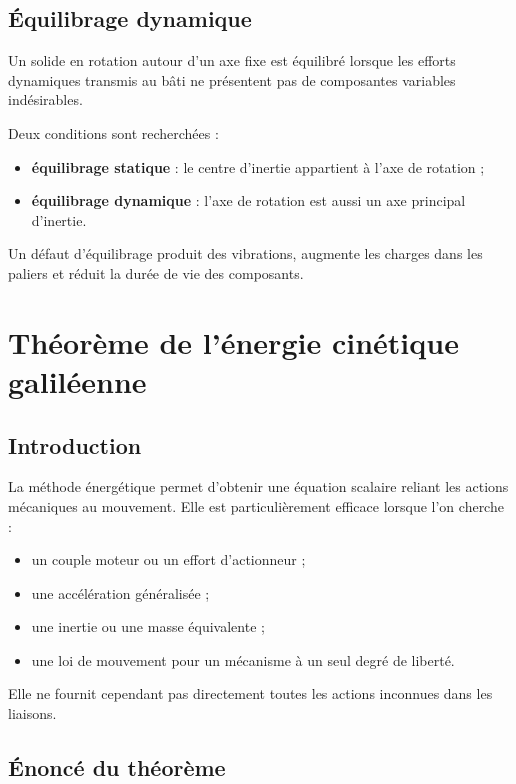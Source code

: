 \subsection{Équilibrage dynamique}

Un solide en rotation autour d'un axe fixe est équilibré lorsque les efforts dynamiques transmis au bâti ne présentent pas de composantes variables indésirables.

Deux conditions sont recherchées :
\begin{itemize}
  \item \textbf{équilibrage statique} : le centre d'inertie appartient à l'axe de rotation ;
  \item \textbf{équilibrage dynamique} : l'axe de rotation est aussi un axe principal d'inertie.
\end{itemize}

Un défaut d'équilibrage produit des vibrations, augmente les charges dans les paliers et réduit la durée de vie des composants.

\section{Théorème de l'énergie cinétique galiléenne}
\label{sec:am-10}

\subsection{Introduction}

La méthode énergétique permet d'obtenir une équation scalaire reliant les actions mécaniques au mouvement. Elle est particulièrement efficace lorsque l'on cherche :
\begin{itemize}
  \item un couple moteur ou un effort d'actionneur ;
  \item une accélération généralisée ;
  \item une inertie ou une masse équivalente ;
  \item une loi de mouvement pour un mécanisme à un seul degré de liberté.
\end{itemize}

Elle ne fournit cependant pas directement toutes les actions inconnues dans les liaisons.

\subsection{Énoncé du théorème}

